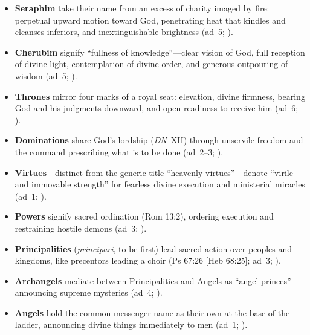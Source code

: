 \begin{itemize}
\item \textbf{Seraphim} take their name from an excess of charity imaged by fire: perpetual upward motion toward God, penetrating heat that kindles and cleanses inferiors, and inextinguishable brightness (ad~5; ).
\item \textbf{Cherubim} signify ``fullness of knowledge''---clear vision of God, full reception of divine light, contemplation of divine order, and generous outpouring of wisdom (ad~5; ).
\item \textbf{Thrones} mirror four marks of a royal seat: elevation, divine firmness, bearing God and his judgments downward, and open readiness to receive him (ad~6; ).
\item \textbf{Dominations} share God's lordship (\emph{DN}~XII) through unservile freedom and the command prescribing what is to be done (ad~2--3; ).
\item \textbf{Virtues}---distinct from the generic title ``heavenly virtues''---denote ``virile and immovable strength'' for fearless divine execution and ministerial miracles (ad~1; ).
\item \textbf{Powers} signify sacred ordination (Rom 13:2), ordering execution and restraining hostile demons (ad~3; ).
\item \textbf{Principalities} (\emph{principari}, to be first) lead sacred action over peoples and kingdoms, like precentors leading a choir (Ps 67:26 [Heb 68:25]; ad~3; ).
\item \textbf{Archangels} mediate between Principalities and Angels as ``angel-princes'' announcing supreme mysteries (ad~4; ).
\item \textbf{Angels} hold the common messenger-name as their own at the base of the ladder, announcing divine things immediately to men (ad~1; ).
\end{itemize}

